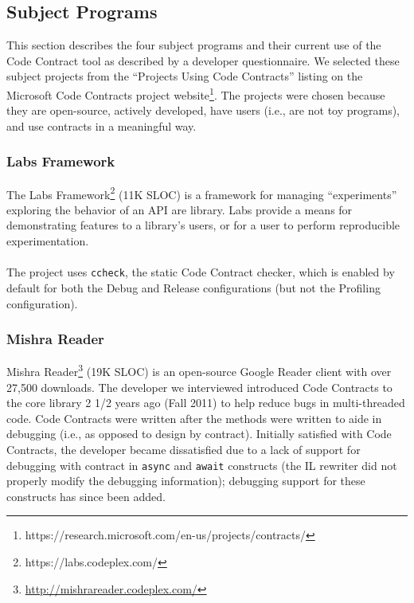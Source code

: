 \subsection{Subject Programs}
\label{sec:subject-programs}

This section describes the four subject programs and their
current use of the Code Contract tool as described by a developer
questionnaire. We selected these subject projects from the ``Projects
Using Code Contracts'' listing on the Microsoft Code Contracts
project
website\footnote{https://research.microsoft.com/en-us/projects/contracts/}.
%
The projects were chosen because they are open-source, actively
developed, have users (i.e., are not toy programs), and use contracts
in a meaningful way.

\subsubsection{Labs Framework}

The Labs Framework\footnote{https://labs.codeplex.com/} (11K SLOC) is
a framework for managing ``experiments'' exploring the behavior of an
API are library. Labs provide a means for demonstrating features to a
library's users, or for a user to perform reproducible
experimentation.
\\ \\
The project uses \verb|ccheck|, the static Code Contract checker,
which is enabled by default for both the Debug and Release
configurations (but not the Profiling configuration).

\subsubsection{Mishra Reader}

Mishra Reader\footnote{\url{http://mishrareader.codeplex.com/}}
(19K SLOC) is an open-source Google Reader client with over 27,500
downloads.
%
The developer we interviewed introduced Code Contracts to the core
library 2 1/2 years ago (Fall 2011) to help reduce bugs in
multi-threaded code.
%
Code Contracts were written after the methods were written to aide in
debugging (i.e., as opposed to design by contract).
%
Initially satisfied with Code Contracts, the developer became
dissatisfied due to a lack of support for debugging with contract in
\verb|async| and \verb|await| constructs (the IL rewriter did not
properly modify the debugging information); debugging support for
these constructs has since been added.

